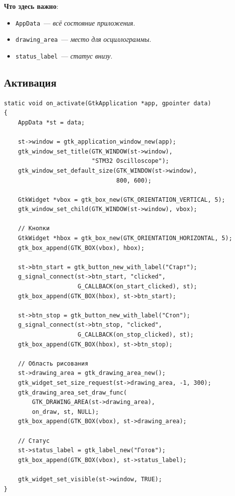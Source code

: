 \textbf{Что здесь важно}:
\begin{itemize}
    \item \texttt{AppData}~--- \emph{всё} \emph{состояние}
          \emph{приложения}.
    \item \texttt{drawing\_area}~--- \emph{место} \emph{для}
          \emph{осциллограммы}.
    \item \texttt{status\_label}~--- \emph{статус} \emph{внизу}.
\end{itemize}

\subsection{Активация}

\begin{listing}[htbp]
\begin{verbatim}
static void on_activate(GtkApplication *app, gpointer data)
{
    AppData *st = data;

    st->window = gtk_application_window_new(app);
    gtk_window_set_title(GTK_WINDOW(st->window),
                         "STM32 Oscilloscope");
    gtk_window_set_default_size(GTK_WINDOW(st->window),
                                800, 600);

    GtkWidget *vbox = gtk_box_new(GTK_ORIENTATION_VERTICAL, 5);
    gtk_window_set_child(GTK_WINDOW(st->window), vbox);

    // Кнопки
    GtkWidget *hbox = gtk_box_new(GTK_ORIENTATION_HORIZONTAL, 5);
    gtk_box_append(GTK_BOX(vbox), hbox);

    st->btn_start = gtk_button_new_with_label("Старт");
    g_signal_connect(st->btn_start, "clicked",
                     G_CALLBACK(on_start_clicked), st);
    gtk_box_append(GTK_BOX(hbox), st->btn_start);

    st->btn_stop = gtk_button_new_with_label("Стоп");
    g_signal_connect(st->btn_stop, "clicked",
                     G_CALLBACK(on_stop_clicked), st);
    gtk_box_append(GTK_BOX(hbox), st->btn_stop);

    // Область рисования
    st->drawing_area = gtk_drawing_area_new();
    gtk_widget_set_size_request(st->drawing_area, -1, 300);
    gtk_drawing_area_set_draw_func(
        GTK_DRAWING_AREA(st->drawing_area),
        on_draw, st, NULL);
    gtk_box_append(GTK_BOX(vbox), st->drawing_area);

    // Статус
    st->status_label = gtk_label_new("Готов");
    gtk_box_append(GTK_BOX(vbox), st->status_label);

    gtk_widget_set_visible(st->window, TRUE);
}
\end{verbatim}
\caption{\texttt{on\_activate()} для проекта}
\label{lst:gtk4-activate}
\end{listing}

